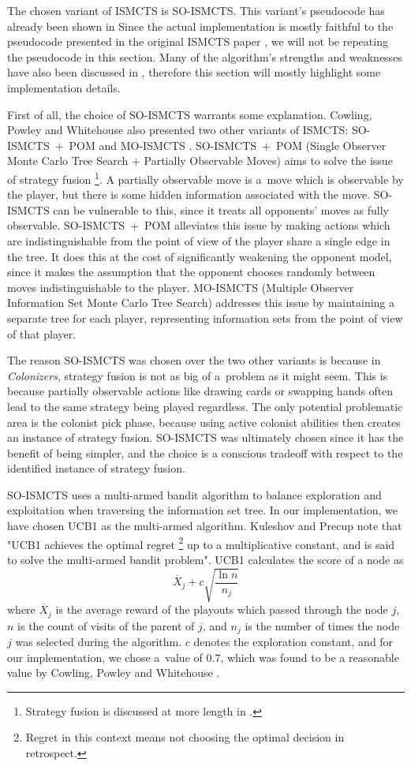 The chosen variant of ISMCTS is SO-ISMCTS. This variant's pseudocode
has already been shown in  Since the actual
implementation is mostly faithful to the pseudocode presented in the original
ISMCTS paper \cite{Cowling12}, we will not be repeating the pseudocode in this section.
Many of the algorithm's strengths and weaknesses have also been discussed in
, therefore this section will mostly highlight some implementation
details.

First of all, the choice of SO-ISMCTS warrants some explanation. Cowling, Powley
and Whitehouse also presented two other variants of ISMCTS: SO-ISMCTS~+~POM and
MO-ISMCTS \cite{Cowling12}. SO-ISMCTS~+~POM (Single Observer Monte Carlo
Tree Search + Partially Observable Moves) aims to solve the issue of
strategy fusion
\footnote{Strategy fusion is discussed at more length in .}.
A partially observable move is a~move which is observable by the player, but there
is some hidden information associated with the move.
SO-ISMCTS can be vulnerable to this, since it treats all
opponents' moves as fully observable. SO-ISMCTS~+~POM alleviates this issue
by making actions which are indistinguishable from the point of view of the player
share a single edge in the tree. It does this at the cost of significantly weakening
the opponent model, since it makes the assumption that the opponent chooses randomly
between moves indistinguishable to the player. MO-ISMCTS (Multiple Observer Information
Set Monte Carlo Tree Search) addresses this issue by maintaining a separate tree
for each player, representing information sets from the point of view of that player.

The reason SO-ISMCTS was chosen over the two other variants is because in \emph{Colonizers},
strategy fusion is not as big of a~problem as it might seem. This is because
partially observable actions like drawing cards or swapping hands often lead to the
same strategy being played regardless. The only potential problematic area
is the colonist pick phase, because using active colonist abilities then
creates an instance of strategy fusion. SO-ISMCTS was ultimately chosen
since it has the benefit of being simpler, and the choice is a conscious
tradeoff with respect to the identified instance of strategy fusion.

SO-ISMCTS uses a multi-armed bandit algorithm to balance exploration
and exploitation when traversing the information set tree.
In our implementation, we have chosen UCB1 as the multi-armed algorithm.
Kuleshov and Precup \cite{Kuleshov00} note that "UCB1 achieves the optimal regret
\footnote{Regret in this context means not choosing the optimal decision in
retrospect.} up to a
multiplicative constant, and is said to solve the multi-armed bandit problem".
UCB1 calculates the score of a node as
$$\overline{X}_{j} + c\sqrt{\frac{\ln{n}}{n_{j}}}$$
where $\overline{X}_{j}$ is the average reward of the playouts which passed through
the node $j$, $n$ is the count of visits of the parent of $j$, and $n_{j}$
is the number of times the node $j$ was selected during the algorithm.
$c$ denotes the exploration constant, and for our implementation, we chose a~value
of $0.7$, which was found to be a reasonable value by Cowling, Powley and Whitehouse
\cite{Cowling12}.

